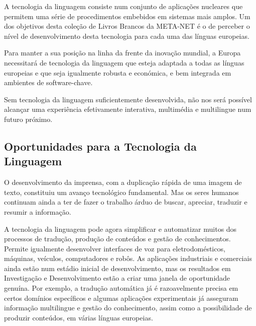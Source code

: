 \begin{multicols}{2}
A tecnologia da linguagem consiste num conjunto de aplicações nucleares que permitem uma série de procedimentos
embebidos em sistemas mais amplos. Um dos objetivos desta coleção de Livros Brancos da META-NET é o de perceber 
o nível de desenvolvimento desta tecnologia para cada uma das línguas europeias.


Para manter a sua posição na linha da frente da inovação mundial, a Europa necessitará de tecnologia da linguagem que esteja 
adaptada a todas as línguas europeias e que seja igualmente robusta e económica, e bem integrada em ambientes de software-chave.

Sem tecnologia da linguagem suficientemente desenvolvida, não nos será possível alcançar uma experiência efetivamente 
interativa, multimédia e multilingue num futuro próximo.

\subsection{Oportunidades para a Tecnologia da Linguagem}

O desenvolvimento da imprensa, com a duplicação rápida de uma imagem de texto, constituiu um avanço tecnológico fundamental. 
Mas os seres humanos continuam ainda a ter de fazer o trabalho árduo de buscar, apreciar, traduzir e resumir a informação. 

A tecnologia da linguagem pode agora simplificar e automatizar muitos dos processos de tradução, produção de conteúdos e gestão de co\-nhe\-ci\-men\-tos. Permite igualmente desenvolver interfaces de voz para eletrodomésticos, máquinas, veículos, computadores e robôs. 
As aplicações industriais e comerciais ainda estão num estádio inicial de desenvolvimento, mas os resultados em Investigação e Desenvolvimento estão 
a criar uma janela de oportunidade genuína. Por exemplo, a tradução automática já é razoavelmente precisa em certos domínios específicos e algumas aplicações experimentais já asseguram informação multilingue e gestão do co\-nhe\-ci\-men\-to, assim como a possibilidade de produzir conteúdos, em várias línguas europeias.


\end{multicols}
